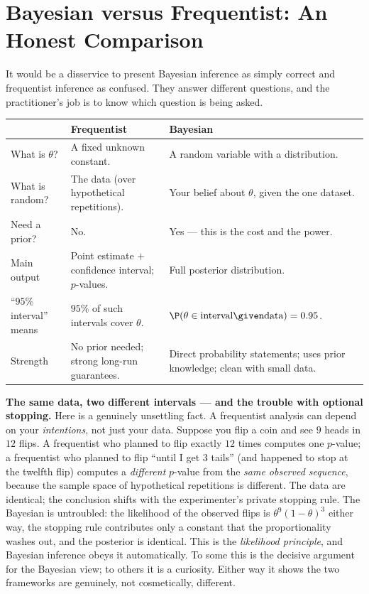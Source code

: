 \section{Bayesian versus Frequentist: An Honest Comparison}
\label{ch31:vs}

It would be a disservice to present Bayesian inference as simply correct and frequentist
inference as confused. They answer different questions, and the practitioner's job is to
know which question is being asked.

\begin{center}
\renewcommand{\arraystretch}{1.3}
\begin{tabular}{p{4.3cm} p{5.0cm} p{5.0cm}}
\toprule
 & \textbf{Frequentist} & \textbf{Bayesian} \\
\midrule
What is $\theta$? & A fixed unknown constant. & A random variable with a distribution. \\
What is random? & The data (over hypothetical repetitions). & Your belief about $\theta$, given the one dataset. \\
Need a prior? & No. & Yes --- this is the cost and the power. \\
Main output & Point estimate $+$ confidence interval; $p$-values. & Full posterior distribution. \\
``$95\%$ interval'' means & $95\%$ of such intervals cover $\theta$. & $\P(\theta \in \text{interval}\given\text{data})=0.95$. \\
Strength & No prior needed; strong long-run guarantees. & Direct probability statements; uses prior knowledge; clean with small data. \\
\bottomrule
\end{tabular}
\end{center}

\begin{paradoxbox}
\textbf{The same data, two different intervals --- and the trouble with optional stopping.}
Here is a genuinely unsettling fact. A frequentist analysis can depend on your
\emph{intentions}, not just your data. Suppose you flip a coin and see $9$ heads in $12$
flips. A frequentist who planned to flip exactly $12$ times computes one $p$-value; a
frequentist who planned to flip ``until I get $3$ tails'' (and happened to stop at the
twelfth flip) computes a \emph{different} $p$-value from the \emph{same observed sequence},
because the sample space of hypothetical repetitions is different. The data are identical;
the conclusion shifts with the experimenter's private stopping rule. The Bayesian is
untroubled: the likelihood of the observed flips is $\theta^9(1-\theta)^3$ either way, the
stopping rule contributes only a constant that the proportionality washes out, and the
posterior is identical. This is the \emph{likelihood principle}, and Bayesian inference
obeys it automatically. To some this is the decisive argument for the Bayesian view; to
others it is a curiosity. Either way it shows the two frameworks are genuinely, not
cosmetically, different.
\end{paradoxbox}

